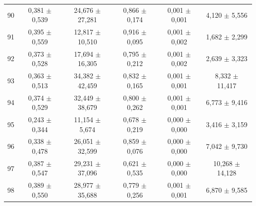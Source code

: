 \begin{tabular}{l c c c c c}
90 & 0,381 $\pm$ 0,539 & 24,676 $\pm$ 27,281 & 0,866 $\pm$ 0,174 & 0,001 $\pm$ 0,001 & 4,120 $\pm$ 5,556 \\
91 & 0,395 $\pm$ 0,559 & 12,817 $\pm$ 10,510 & 0,916 $\pm$ 0,095 & 0,001 $\pm$ 0,002 & 1,682 $\pm$ 2,299 \\
92 & 0,373 $\pm$ 0,528 & 17,694 $\pm$ 16,305 & 0,795 $\pm$ 0,212 & 0,001 $\pm$ 0,002 & 2,639 $\pm$ 3,323 \\
93 & 0,363 $\pm$ 0,513 & 34,382 $\pm$ 42,459 & 0,832 $\pm$ 0,165 & 0,001 $\pm$ 0,001 & 8,332 $\pm$ 11,417 \\
94 & 0,374 $\pm$ 0,529 & 32,449 $\pm$ 38,679 & 0,800 $\pm$ 0,262 & 0,001 $\pm$ 0,001 & 6,773 $\pm$ 9,416 \\
95 & 0,243 $\pm$ 0,344 & 11,154 $\pm$ 5,674 & 0,678 $\pm$ 0,219 & 0,000 $\pm$ 0,000 & 3,416 $\pm$ 3,159 \\
96 & 0,338 $\pm$ 0,478 & 26,051 $\pm$ 32,599 & 0,859 $\pm$ 0,076 & 0,000 $\pm$ 0,000 & 7,042 $\pm$ 9,730 \\
97 & 0,387 $\pm$ 0,547 & 29,231 $\pm$ 37,096 & 0,621 $\pm$ 0,535 & 0,000 $\pm$ 0,000 & 10,268 $\pm$ 14,128 \\
98 & 0,389 $\pm$ 0,550 & 28,977 $\pm$ 35,688 & 0,779 $\pm$ 0,256 & 0,001 $\pm$ 0,001 & 6,870 $\pm$ 9,585 \\
\hline 
 \end{tabular}
